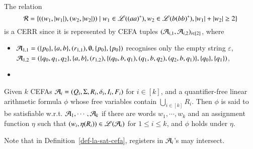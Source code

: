 \begin{example}
The relation 
\[\mathcal{R}=\{((w_1, |w_1|), (w_2, |w_2|)) \mid  w_1 \in \mathscr{L}((aa)^*), w_2 \in \mathscr{L}(b(bb)^*), |w_1|+|w_2| \ge 2\}\] 
is a CERR since it is represented by CEFA tuples $(\mathcal{A}_{i,1}, \mathcal{A}_{i,2})_{i \in [2]}$, where 
\begin{itemize}
\item $\mathcal{A}_{1,1} = (\{p_0\}, \{a,b\}, (r_{1,1}), \emptyset, \{p_0\}, \{p_0\})$ recognises only the empty string $\varepsilon$, $\mathcal{A}_{1,2}=(\{q_0,q_1,q_2\}, \{a,b\}, (r_{1,2}), \{(q_0, b, q_1), (q_1, b, q_2), (q_2, b, q_1)\}, \{q_0\}, \{q_1\})$,
\item 
\end{itemize}
\end{example}


\begin{definition}\label{def-la-sat-cefa}
	Given $k$ CEFAs $\mathcal{A}_i=(Q_i, \Sigma, R_i, \delta_i, I_i, F_i)$ for $i\in [k]$, %
	and  a quantifier-free linear arithmetic formula $\phi$ 
	whose free variables contain $\bigcup_{i\in [k]} R_i$. Then $\phi$ is said to be satisfiable w.r.t. $\mathcal{A}_1, \cdots, \mathcal{A}_k$ if  there are words $w_1, \cdots, w_k$ and an assignment function $\eta$ %
	such that  $(w_i, \eta(R_i)) \in \mathscr{L}(\mathcal{A}_i)$ for $1\leq i\leq k$, and $\phi$ holds under $\eta$.
\end{definition}
Note that in Definition~\ref{def-la-sat-cefa}, registers in $\mathcal{A}_i$'s may intersect. %

